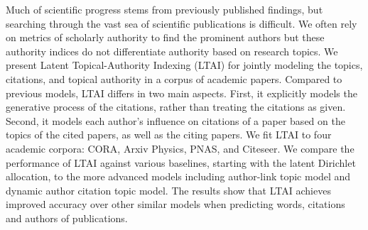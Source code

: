 Much of scientific progress stems from previously published findings, but searching through the vast sea of scientific publications is difficult. We often rely on metrics of scholarly authority to find the prominent authors but these authority indices do not differentiate authority based on research topics. We present Latent Topical-Authority Indexing (LTAI) for jointly modeling the topics, citations, and topical authority in a corpus of academic papers. Compared to previous models, LTAI differs in two main aspects. First, it explicitly models the generative process of the citations, rather than treating the citations as given. Second, it models each author's influence on citations of a paper based on the topics of the cited papers, as well as the citing papers. We fit LTAI to four academic corpora: CORA, Arxiv Physics, PNAS, and Citeseer. We compare the performance of LTAI against various baselines, starting with the latent Dirichlet allocation, to the more advanced models including author-link topic model and dynamic author citation topic model. The results show that LTAI achieves improved accuracy over other similar models when predicting words, citations and authors of publications.
